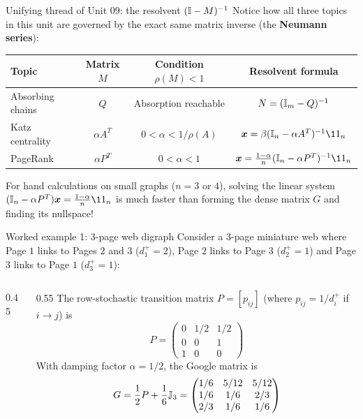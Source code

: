 \documentclass[aspectratio=169]{beamer}\usepackage[]{graphicx}\usepackage[]{xcolor}
\begin{document}
\begin{frame}{Unifying thread of Unit 09: the resolvent $(\mathbb{I} - M)^{-1}$}
Notice how all three topics in this unit are governed by the exact same matrix inverse (the \textbf{Neumann series}):
\vfill
\begin{center}
\small
\renewcommand{\arraystretch}{1.6}
\begin{tabular}{l|c|c|c}
\textbf{Topic} & \textbf{Matrix $M$} & \textbf{Condition $\rho(M) < 1$} & \textbf{Resolvent formula} \\ \hline
Absorbing chains & $Q$ & Absorption reachable & $N = (\mathbb{I}_m - Q)^{-1}$ \\
Katz centrality & $\alpha A^T$ & $0 < \alpha < 1/\rho(A)$ & $\bx = \beta(\II_n - \alpha A^T)^{-1}\11_n$ \\
PageRank & $\alpha P^T$ & $0 < \alpha < 1$ & $\bx = \frac{1-\alpha}{n}(\II_n - \alpha P^T)^{-1}\11_n$
\end{tabular}
\end{center}
\vfill
For hand calculations on small graphs ($n = 3$ or $4$), solving the linear system $(\II_n - \alpha P^T)\bx = \frac{1-\alpha}{n}\11_n$ is much faster than forming the dense matrix $G$ and finding its nullspace!
\end{frame}

\begin{frame}{Worked example 1: 3-page web digraph}
Consider a 3-page miniature web where Page $1$ links to Pages $2$ and $3$ ($d_1^+ = 2$), Page $2$ links to Page $3$ ($d_2^+ = 1$) and Page $3$ links to Page $1$ ($d_3^+ = 1$):
\vfill
\begin{columns}[c]
\begin{column}{0.45\textwidth}
\centering
{}
\end{column}
\begin{column}{0.55\textwidth}
The row-stochastic transition matrix $P = [p_{ij}]$ (where $p_{ij} = 1/d_i^+$ if $i \to j$) is
\[
P = \begin{pmatrix}
0 & 1/2 & 1/2 \\
0 & 0 & 1 \\
1 & 0 & 0
\end{pmatrix}
\]
With damping factor $\alpha = 1/2$, the Google matrix is
\[
G = \frac{1}{2}P + \frac{1}{6}\mathbb{J}_3 = \begin{pmatrix}
1/6 & 5/12 & 5/12 \\
1/6 & 1/6 & 2/3 \\
2/3 & 1/6 & 1/6
\end{pmatrix}
\]
\end{column}
\end{columns}
\end{frame}
\end{document}
